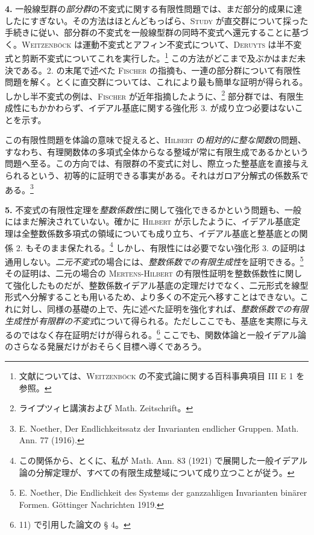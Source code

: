 \documentclass[11pt]{article}
\begin{document}
\textbf{4.} 一般線型群の\emph{部分群}の不変式に関する有限性問題では、まだ部分的成果に達したにすぎない。\mbox{その方法}はほとんどもっぱら、\textsc{Study} が直交群について採った手続きに従い、部分群の不変式を一般線型群の同時不変式へ還元することに基づく。\textsc{Weitzenböck} は運動不変式とアフィン不変式について、\textsc{Deruyts} は半不変式と剪断不変式についてこれを実行した。\footnote{文献については、\textsc{Weitzenböck} の不変式論に関する百科事典項目 III E 1 を参照。} この方法がどこまで及ぶかはまだ未決である。2. の末尾で述べた \textsc{Fischer} の指摘も、一連の部分群について有限性問題を解く。とくに直交群については、これにより最も簡単な証明が得られる。しかし半不変式の例は、\textsc{Fischer} が近年指摘したように、\footnote{ライプツィヒ講演および Math. Zeitschrift。} 部分群では、有限生成性にもかかわらず、イデアル基底に関する強化形 3. が成り立つ必要はないことを示す。

この有限性問題を体論の意味で捉えると、\textsc{Hilbert} の\emph{相対的に整な関数}の問題、すなわち、有理関数体の多項式全体からなる整域が常に有限生成であるかという問題へ至る。この方向では、有限群の不変式に対し、際立った整基底を直接与えられるという、初等的に証明できる事実がある。それはガロア分解式の係数系である。\footnote{E. Noether, Der Endlichkeitssatz der Invarianten endlicher Gruppen. Math. Ann. 77 (1916).}

\textbf{5.} 不変式の有限性定理を\emph{整数係数性}に関して強化できるかという問題も、一般にはまだ解決されていない。確かに \textsc{Hilbert} が示したように、イデアル基底定理は全整数係数多項式の領域についても成り立ち、イデアル基底と整基底との関係 2. もそのまま保たれる。\footnote{この関係から、とくに、私が Math. Ann. 83 (1921) で展開した一般イデアル論の分解定理が、すべての有限生成整域について成り立つことが従う。} しかし、有限性には必要でない強化形 3. の証明は通用しない。\emph{二元不変式}の場合には、\emph{整数係数での有限生成性}を証明できる。\footnote{E. Noether, Die Endlichkeit des Systems der ganzzahligen Invarianten binärer Formen. Göttinger Nachrichten 1919.} その証明は、二元の場合の \textsc{Mertens-Hilbert} の有限性証明を整数係数性に関して強化したものだが、整数係数イデアル基底の定理だけでなく、二元形式を線型形式へ分解することも用いるため、より多くの不定元へ移すことはできない。これに対し、同様の基礎の上で、先に述べた証明を強化すれば、\emph{整数係数での有限生成性}が\emph{有限群の不変式}について得られる。ただしここでも、基底を実際に与えるのではなく存在証明だけが得られる。\footnote{11) で引用した論文の § 4。} ここでも、関数体論と一般イデアル論のさらなる発展だけがおそらく目標へ導くであろう。
\end{document}

